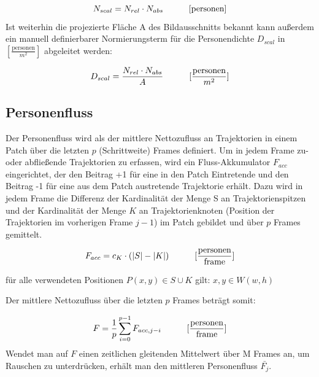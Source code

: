 \begin{equation}
    N_{scal}=N_{rel}\cdot N_{abs} \hskip 30pt [\text{personen}]
\end{equation}
\vskip 10pt
Ist weiterhin die projezierte Fläche A des Bildausschnitts bekannt kann außerdem ein manuell definierbarer Normierungsterm für die Personendichte $D_{scal}$ in $[\frac{\text{personen}}{m^2}]$ abgeleitet werden:

\begin{equation}
    D_{scal}=\frac{N_{rel}\cdot N_{abs}}{A} \hskip 30pt [\frac{\text{personen}}{m^2}]
\end{equation}
\newpage
\subsection{Personenfluss}
Der Personenfluss wird als der mittlere Nettozufluss an Trajektorien in einem Patch über die letzten $p$ (Schrittweite) Frames definiert. Um in jedem Frame zu- oder abfließende Trajektorien zu erfassen, wird ein Fluss-Akkumulator $F_{acc}$ eingerichtet, der den Beitrag +1 für eine in den Patch Eintretende und den Beitrag -1 für eine aus dem Patch austretende Trajektorie erhält. Dazu wird in jedem Frame die Differenz der Kardinalität der Menge S an Trajektorienspitzen und der Kardinalität der Menge $K$ an Trajektorienknoten (Position der Trajektorien im vorherigen Frame $j-1$) im Patch gebildet und über $p$ Frames gemittelt.


\begin{equation}
F_{acc} = c_K\cdot (|S| - |K|) \hskip 30pt [\frac{\text{personen}}{\text{frame}}]
\end{equation}
\vskip 5pt
\begin{flushleft}
für alle verwendeten Positionen $P(x,y)\in S\cup K$ gilt: $x,y\in W(w,h)$
\end{flushleft}
\vskip 3pt
Der mittlere Nettozufluss über die letzten $p$ Frames beträgt somit:

\begin{equation}
    F = \frac{1}{p}\sum_{i=0}^{p-1}F_{acc,j-i} \hskip 30pt [\frac{\text{personen}}{\text{frame}}]
\end{equation}
\vskip 10pt
Wendet man auf $F$ einen zeitlichen gleitenden Mittelwert über M Frames an, um Rauschen zu unterdrücken, erhält man den mittleren Personenfluss $\bar{F_j}$.

